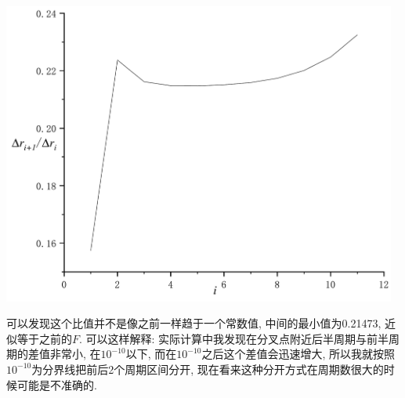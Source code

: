 \documentclass[UTF8]{ctexart}
\begin{document}
        \begin{center}
            \includegraphics[width=13cm]{q9/delta_r.pdf}
        \end{center}
        可以发现这个比值并不是像之前一样趋于一个常数值, 中间的最小值为0.21473, 近似等于之前的$F$.
        可以这样解释: 实际计算中我发现在分叉点附近后半周期与前半周期的差值非常小,
        在$10^{-10}$以下, 而在$10^{-10}$之后这个差值会迅速增大,
        所以我就按照$10^{-10}$为分界线把前后2个周期区间分开,
        现在看来这种分开方式在周期数很大的时候可能是不准确的.
\end{document}
